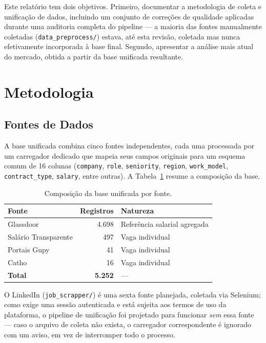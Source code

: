 \documentclass[10pt,twocolumn]{article}
\begin{document}
Este relatório tem dois objetivos. Primeiro, documentar a metodologia de coleta
e unificação de dados, incluindo um conjunto de correções de qualidade
aplicadas durante uma auditoria completa do pipeline --- a maioria das fontes
manualmente coletadas (\texttt{data\_preprocess/}) estava, até esta revisão,
coletada mas nunca efetivamente incorporada à base final. Segundo, apresentar
a análise mais atual do mercado, obtida a partir da base unificada resultante.

\section{Metodologia}

\subsection{Fontes de Dados}

A base unificada combina cinco fontes independentes, cada uma processada por um
carregador dedicado que mapeia seus campos originais para um esquema comum de
16 colunas (\texttt{company}, \texttt{role}, \texttt{seniority}, \texttt{region},
\texttt{work\_model}, \texttt{contract\_type}, \texttt{salary}, entre outras). A
Tabela~\ref{tab:sources} resume a composição da base.

\begin{table}[H]
\centering
\small
\caption{Composição da base unificada por fonte.}
\label{tab:sources}
\begin{tabular}{@{}lrl@{}}
\toprule
\textbf{Fonte} & \textbf{Registros} & \textbf{Natureza} \\
\midrule
Glassdoor & 4.698 & Referência salarial agregada \\
Salário Transparente & 497 & Vaga individual \\
Portais Gupy & 41 & Vaga individual \\
Catho & 16 & Vaga individual \\
\midrule
\textbf{Total} & \textbf{5.252} & --- \\
\bottomrule
\end{tabular}
\end{table}

O LinkedIn (\texttt{job\_scrapper/}) é uma sexta fonte planejada, coletada via
Selenium; como exige uma sessão autenticada e está sujeita aos termos de uso da
plataforma, o pipeline de unificação foi projetado para funcionar
\emph{sem} essa fonte --- caso o arquivo de coleta não exista, o carregador
correspondente é ignorado com um aviso, em vez de interromper todo o processo.
\end{document}
